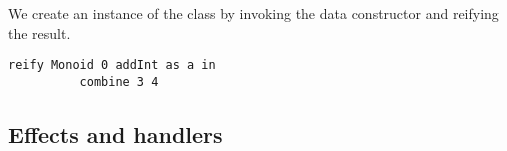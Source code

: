     \noindent We create an instance of the class by invoking the data constructor and reifying the result.

    \noindent
    \begin{minipage}{\linewidth}
      \begin{lstlisting}[gobble=8, mathescape=true]
        reify Monoid 0 addInt as a in
          combine 3 4
      \end{lstlisting}
    \end{minipage}

  \subsection{Effects and handlers}
